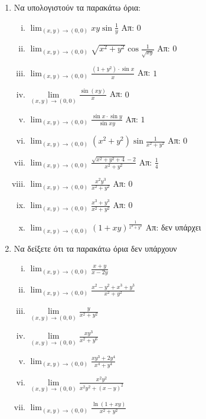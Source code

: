 



\everymath{\displaystyle}



\begin{center}
\end{center}


\vspace{\baselineskip}

\begin{enumerate}
  \item Να υπολογιστούν τα παρακάτω όρια:
  \begin{enumerate}[i)]
	  \item $ \lim_{(x,y)\to (0,0)} xy\sin{\frac{ 1 }{ y }} $ \hfill Απ: $ 0 $
  \item $ \lim_{(x,y)\to (0,0)} \sqrt{ x^{2} + y^{2} } \cos{\frac{ 1 }{ \sqrt{ xy } }} $ \hfill Απ: $ 0 $
      \item $ \lim_{(x,y)\to (0,0)} \frac{ (1+y^{2})\cdot \sin{x} }{ x } $ \hfill Απ: $ 1 $
    \item $\lim\limits_{(x,y)\to (0,0)}\frac{\sin(xy)}{x}$ \hfill Απ: $0$
	\item $ \lim_{(x,y)\to (0,0)} \frac{ \sin{x} \cdot \sin{y} }{ \sin{xy} } $ \hfill Απ: $ 1 $
	  \item $ \lim_{(x,y)\to (0,0)} (x^{2} + y^{2}) \sin{\frac{ 1 }{ x^{2} + y^{2} }} $ \hfill Απ: $ 0 $ 
	\item $ \lim_{(x,y)\to (0,0)} \frac{ \sqrt{ x^{2}+y^{2}+4 } - 2 }{ x^{2}+y^{2} } $ \hfill Απ: $
		\frac{ 1 }{ 4 } $
\item $ \lim_{(x,y)\to (0,0)} \frac{ x^{2}y^{3} }{x^{2}+y^{2}}    $ \hfill Απ: $0 $ 
\item $ \lim_{(x,y)\to (0,0)} \frac{ x^{3}+y^{3} }{ x^{2}+y^{2} } $ \hfill Απ: $ 0 $
\item $ \lim_{(x,y)\to (0,0)} (1+xy)^{\frac{ 1 }{ x^{2}+y^{2} }} $ \hfill Απ: δεν υπάρχει
		  \end{enumerate}
  
  \item Να δείξετε ότι τα παρακάτω όρια δεν υπάρχουν

	  \begin{enumerate}[i)]
		  \item $ \lim_{(x,y)\to (0,0)} \frac{ x + y }{ x - 2y } $ 
		  \item $ \lim_{(x,y)\to (0,0)} \frac{ x^{2}-y^{2}+x^{3}+y^{3} }{ x^{2}+y^{2} } $ 
          \item $ \lim\limits_{(x,y)\to (0, 0)} \frac{y}{x^{2}+y^{2}} $  
          \item $ \lim\limits_{(x,y)\to (0, 0)} \frac{xy^{3}}{x^{2}+y^{6}} $
		  \item $ \lim_{(x,y)\to (0,0)} \frac{ xy^{3} + 2y^{4} }{ x^{4}+y^{4}}  $
		  \item $\lim\limits_{(x,y)\to (0,0)}\frac{x^{2}y^{2}}{x^{2}y^{2}+(x-y)^{2}}$ 
		  \item $ \lim_{(x,y)\to (0,0)} \frac{ \ln{( 1+xy )} }{ x^{2}+y^{2} }  $
	  \end{enumerate}


\end{enumerate}
